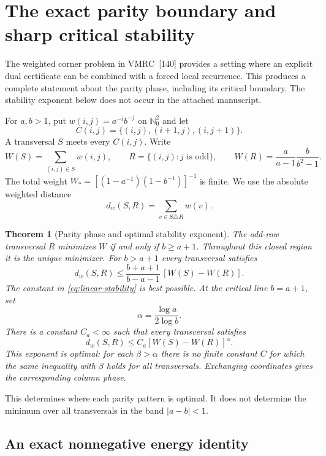 \documentclass[11pt,a4paper]{article}
\newtheorem{theorem}{Theorem}[section]
\theoremstyle{definition}
\theoremstyle{remark}\newtheorem{remark}[theorem]{Remark}
\begin{document}
\section{The exact parity boundary and sharp critical stability}
\label{sec:parity}

The weighted corner problem in VMRC~[140] provides a setting where an
explicit dual certificate can be combined with a forced local recurrence.
This produces a complete statement about the parity phase, including its
critical boundary. The stability exponent below does not occur in the
attached manuscript.

For $a,b>1$, put $w(i,j)=a^{-i}b^{-j}$ on $\mathbb N_0^2$ and let
\[
 C(i,j)=\{(i,j),(i+1,j),(i,j+1)\}.
\]
A transversal $S$ meets every $C(i,j)$. Write
\[
 W(S)=\sum_{(i,j)\in S}w(i,j),\qquad
 R=\{(i,j):j\text{ is odd}\},\qquad
 W(R)=\frac{a}{a-1}\frac{b}{b^2-1}.
\]
The total weight $W_*=[(1-a^{-1})(1-b^{-1})]^{-1}$ is finite.
We use the absolute weighted distance
\[
 d_w(S,R)=\sum_{v\in S\triangle R}w(v).
\]

\begin{theorem}[Parity phase and optimal stability exponent]
\label{thm:parity-stability}
The odd-row transversal $R$ minimizes $W$ if and only if $b\ge a+1$.
Throughout this closed region it is the unique minimizer.
For $b>a+1$ every transversal satisfies
\begin{equation}\label{eq:linear-stability}
 d_w(S,R)\le\frac{b+a+1}{b-a-1}\,[W(S)-W(R)].
\end{equation}
The constant in \eqref{eq:linear-stability} is best possible.
At the critical line $b=a+1$, set
\[
 \alpha=\frac{\log a}{2\log b}.
\]
There is a constant $C_a<\infty$ such that every transversal satisfies
\begin{equation}\label{eq:critical-stability}
 d_w(S,R)\le C_a[W(S)-W(R)]^\alpha.
\end{equation}
This exponent is optimal: for each $\beta>\alpha$ there is no finite
constant $C$ for which the same inequality with $\beta$ holds for all
transversals. Exchanging coordinates gives the corresponding column phase.
\end{theorem}

This determines where each parity pattern is optimal. It does not determine
the minimum over all transversals in the band $|a-b|<1$.

\subsection{An exact nonnegative energy identity}
\end{document}
